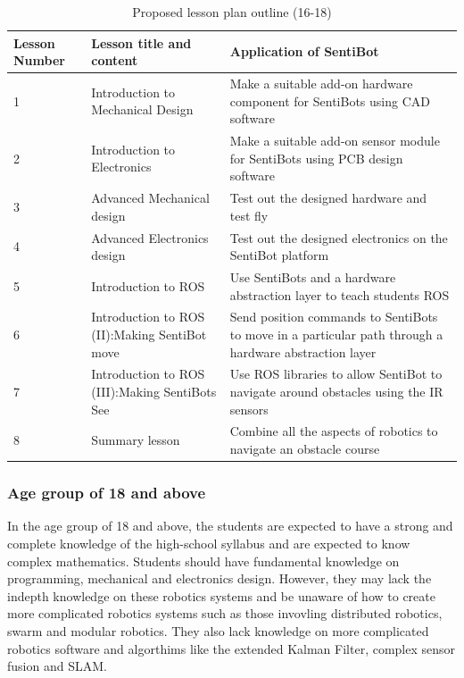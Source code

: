 \documentclass[12pt]{article}
\begin{document}
\begin{table}[h]
	\centering
	\begin{tabularx}{\linewidth}{ | >{\setlength\hsize{.2\hsize}} X | >{\setlength\hsize{.5\hsize}} X | X | }
		Lesson Number & Lesson title and content & Application of SentiBot \\
		\hline
		1 &  Introduction to Mechanical Design & Make a suitable add-on hardware component for SentiBots using CAD software \\
		2 &  Introduction to Electronics &  Make a suitable add-on sensor module for SentiBots using PCB design software \\
		3 &  Advanced Mechanical design & Test out the designed hardware and test fly \\
		4 &  Advanced Electronics design & Test out the designed electronics on the SentiBot platform \\
		5 &  Introduction to ROS & Use SentiBots and a hardware abstraction layer to teach students ROS \\
		6 &  Introduction to ROS (II):Making SentiBot move & Send position commands to SentiBots to move in a particular path through a hardware abstraction layer \\
		7 &  Introduction to ROS (III):Making SentiBots See & Use ROS libraries to allow SentiBot to navigate around obstacles using the IR sensors \\
		8 &  Summary lesson & Combine all the aspects of robotics to navigate an obstacle course \\
	\end{tabularx}
	\caption{Proposed lesson plan outline (16-18)}
	\label{tab:lessonplan1}
\end{table}

\subsubsection{Age group of 18 and above}

In the age group of 18 and above, the students are expected to have a strong and complete knowledge of the high-school syllabus and are expected to know complex mathematics. Students should have fundamental knowledge on programming, mechanical and electronics design. However, they may lack the indepth knowledge on these robotics systems and be unaware of how to create more complicated robotics systems such as those invovling distributed robotics, swarm and modular robotics. They also lack knowledge on more complicated robotics software and algorthims like the extended Kalman Filter, complex sensor fusion and SLAM.
\end{document}
